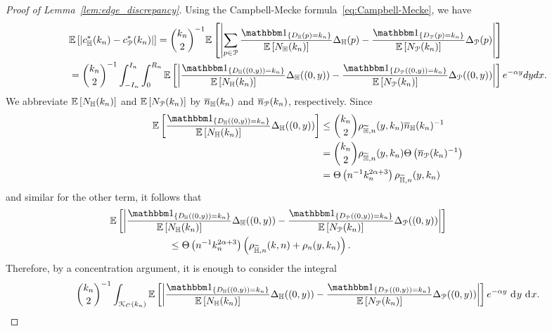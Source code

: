 \begin{proof}[Proof of Lemma~\ref{lem:edge_discrepancy}] 
Using the Campbell-Mecke formula~\eqref{eq:Campbell-Mecke}, we have 
\begin{align*} 
	&\Exp{\left|  c_{\H}^\ast(k_n) - c_\Pcal^\ast(k_n)\right|}= 
	\binom{k_n}{2}^{-1}\Exp{\left|\sum_{p \in \Pcal} 
    	\frac{\ind{D_\H(p) = k_n}}{\Exp{N_\H(k_n)}} \Delta_\H(p )
        - \frac{\ind{D_\Pcal(p) = k_n}}{\Exp{N_\Pcal(k_n)}}  \Delta_\Pcal(p)\right|} \\
    &= \binom{k_n}{2}^{-1} \int_{-I_n}^{I_n} 
        \int_0^{R_n} 
        \Exp{ \left| \frac{\ind{D_\H((0,y)) = k_n}}{\Exp{N_\H(k_n)}} \Delta_\H ((0,y) )
        - \frac{\ind{D_\Pcal((0,y)) = k_n}}{\Exp{N_\Pcal(k_n)}}  \Delta_\Pcal ((0,y))
        \right|} e^{-\alpha y}dy dx.
\end{align*}
We abbreviate $\mathbb{E}\left[N_{\mathbb{H}} (k_n)\right]$ and $\mathbb{E}\left[N_{{\mathcal P}} (k_n)\right]$ by $\overline{n}_{\mathbb{H}}(k_n)$ and $\overline{n}_{{\mathcal P}}(k_n)$, respectively. Since 
\begin{align*}
	\Exp{\frac{\ind{D_\H((0,y)) = k_n}}{\Exp{N_\H(k_n)}} \Delta_\H ((0,y) )}
	&\le \binom{k_n}{2} \rho_{\HP,n}(y,k_n)\expH^{-1} \\
	&= \binom{k_n}{2} \rho_{\HP,n}(y,k_n)\bigT{\expP^{-1}}\\
	&= \bigT{n^{-1} k_n^{2\alpha + 3}}\rho_{\HP,n}(y,k_n)
\end{align*}
and similar for the other term, it follows that
\begin{align*}
	&\hspace{-60pt}\Exp{ \left| \frac{\ind{D_\H((0,y)) = k_n}}{\Exp{N_\H(k_n)}} \Delta_\H ((0,y) )
		- \frac{\ind{D_\Pcal((0,y)) = k_n}}{\Exp{N_\Pcal(k_n)}}  \Delta_\Pcal ((0,y))\right|} \\
	&\le \bigT{n^{-1} k_n^{2\alpha + 3}}\left(\rho_{\HP,n}(k,n) + \rho_n(y,k_n)\right).
\end{align*}
Therefore, by a concentration argument, it is enough to consider the integral
\begin{equation} \label{eq:expectation_total}
	\binom{k_n}{2}^{-1} \int_{\Kcal_{C}(k_n)} 
	        \Exp{ \left| \frac{\ind{D_\H((0,y)) = k_n}}{\Exp{N_\H(k_n)}} \Delta_\H ((0,y) )
	        - \frac{\ind{D_\Pcal((0,y)) = k_n}}{\Exp{N_\Pcal(k_n)}}  \Delta_\Pcal ((0,y))
	        \right|} e^{-\alpha y} \dd y \dd x.
\end{equation}


\end{proof}
